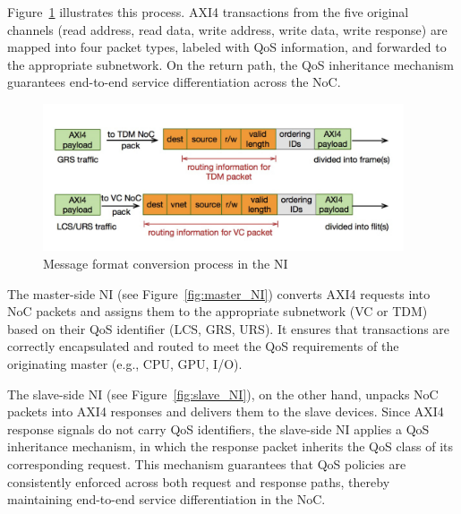 Figure~\ref{fig:message_format} illustrates this process. AXI4 transactions from the five original channels (read address, read data, write address, write data, write response) are mapped into four packet types, labeled with QoS information, and forwarded to the appropriate subnetwork. On the return path, the QoS inheritance mechanism guarantees end-to-end service differentiation across the NoC.

\begin{figure}[htbp]
    \centering
    \includegraphics[width=0.95\textwidth]{img/Message format conversion.png}
    \caption{Message format conversion process in the NI}
    \label{fig:message_format}
\end{figure}


The master-side NI (see Figure~\ref{fig:master_NI}) converts AXI4 requests into NoC packets and assigns them to the appropriate subnetwork (VC or TDM) based on their QoS identifier (\ac{LCS}, \ac{GRS}, \ac{URS}). It ensures that transactions are correctly encapsulated and routed to meet the QoS requirements of the originating master (e.g., CPU, GPU, I/O).

The slave-side NI (see Figure~\ref{fig:slave_NI}), on the other hand, unpacks NoC packets into AXI4 responses and delivers them to the slave devices. Since AXI4 response signals do not carry QoS identifiers, the slave-side NI applies a QoS inheritance mechanism, in which the response packet inherits the QoS class of its corresponding request. 
This mechanism guarantees that QoS policies are consistently enforced across both request and response paths, thereby maintaining end-to-end service differentiation in the NoC.

